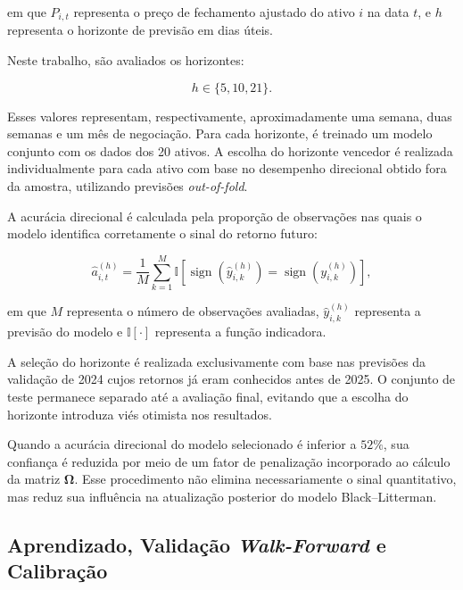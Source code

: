 em que $P_{i,t}$ representa o preço de fechamento ajustado do ativo $i$ na data $t$, e $h$ representa o horizonte de previsão em dias úteis.

Neste trabalho, são avaliados os horizontes:

\begin{equation}
    h\in\{5,10,21\}.
    \label{eq:horizontes}
\end{equation}

Esses valores representam, respectivamente, aproximadamente uma semana, duas semanas e um mês de negociação. Para cada horizonte, é treinado um modelo conjunto com os dados dos 20 ativos. A escolha do horizonte vencedor é realizada individualmente para cada ativo com base no desempenho direcional obtido fora da amostra, utilizando previsões \textit{out-of-fold}.

A acurácia direcional é calculada pela proporção de observações nas quais o modelo identifica corretamente o sinal do retorno futuro:

\begin{equation}
    \widehat{a}_{i,t}^{(h)}
    =
    \frac{1}{M}
    \sum_{k=1}^{M}
    \mathbb{I}
    \left[
        \operatorname{sign}
        \left(
            \widehat{y}_{i,k}^{(h)}
        \right)
        =
        \operatorname{sign}
        \left(
            y_{i,k}^{(h)}
        \right)
    \right],
    \label{eq:acuracia_direcional}
\end{equation}

em que $M$ representa o número de observações avaliadas, $\widehat{y}_{i,k}^{(h)}$ representa a previsão do modelo e $\mathbb{I}[\cdot]$ representa a função indicadora.

A seleção do horizonte é realizada exclusivamente com base nas previsões da validação de 2024 cujos retornos já eram conhecidos antes de 2025. O conjunto de teste permanece separado até a avaliação final, evitando que a escolha do horizonte introduza viés otimista nos resultados.

Quando a acurácia direcional do modelo selecionado é inferior a $52\%$, sua confiança é reduzida por meio de um fator de penalização incorporado ao cálculo da matriz $\boldsymbol{\Omega}$. Esse procedimento não elimina necessariamente o sinal quantitativo, mas reduz sua influência na atualização posterior do modelo Black--Litterman.

\subsection{Aprendizado, Validação \textit{Walk-Forward} e Calibração}
\label{subsec:aprendizagem_validacao}

